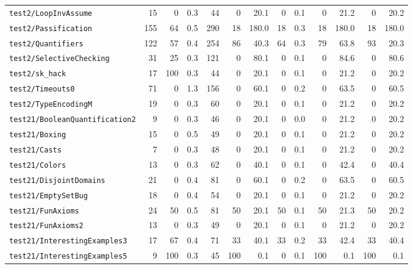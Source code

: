 \documentclass[a4paper,final]{llncs}
\begin{document}
\begin{scriptsize}
\begin{longtable}{l |r *{1}{rr} |r *{4}{rr}}
\verb|test2/LoopInvAssume|  &  15  &  0  &  0.3  &  44  &  0  &  20.1  &  0  &  0.1  &  0  &  21.2  &  0  &  20.2  \\
\verb|test2/Passification|  &  155  &  64  &  0.5  &  290  &  18  &  180.0  &  18  &  0.3  &  18  &  180.0  &  18  &  180.0  \\
\verb|test2/Quantifiers|  &  122  &  57  &  0.4  &  254  &  86  &  40.3  &  64  &  0.3  &  79  &  63.8  &  93  &  20.3  \\
\verb|test2/SelectiveChecking|  &  31  &  25  &  0.3  &  121  &  0  &  80.1  &  0  &  0.1  &  0  &  84.6  &  0  &  80.6  \\
\verb|test2/sk_hack|  &  17  &  100  &  0.3  &  44  &  0  &  20.1  &  0  &  0.1  &  0  &  21.2  &  0  &  20.2  \\
\verb|test2/Timeouts0|  &  71  &  0  &  1.3  &  156  &  0  &  60.1  &  0  &  0.2  &  0  &  63.5  &  0  &  60.5  \\
\verb|test2/TypeEncodingM|  &  19  &  0  &  0.3  &  60  &  0  &  20.1  &  0  &  0.1  &  0  &  21.2  &  0  &  20.2  \\
\verb|test21/BooleanQuantification2|  &  9  &  0  &  0.3  &  46  &  0  &  20.1  &  0  &  0.0  &  0  &  21.2  &  0  &  20.2  \\
\verb|test21/Boxing|  &  15  &  0  &  0.5  &  49  &  0  &  20.1  &  0  &  0.1  &  0  &  21.2  &  0  &  20.2  \\
\verb|test21/Casts|  &  7  &  0  &  0.3  &  48  &  0  &  20.1  &  0  &  0.1  &  0  &  21.2  &  0  &  20.2  \\
\verb|test21/Colors|  &  13  &  0  &  0.3  &  62  &  0  &  40.1  &  0  &  0.1  &  0  &  42.4  &  0  &  40.4  \\
\verb|test21/DisjointDomains|  &  21  &  0  &  0.4  &  81  &  0  &  60.1  &  0  &  0.2  &  0  &  63.5  &  0  &  60.5  \\
\verb|test21/EmptySetBug|  &  18  &  0  &  0.4  &  54  &  0  &  20.1  &  0  &  0.1  &  0  &  21.2  &  0  &  20.2  \\
\verb|test21/FunAxioms|  &  24  &  50  &  0.5  &  81  &  50  &  20.1  &  50  &  0.1  &  50  &  21.3  &  50  &  20.2  \\
\verb|test21/FunAxioms2|  &  13  &  0  &  0.3  &  49  &  0  &  20.1  &  0  &  0.1  &  0  &  21.2  &  0  &  20.2  \\
\verb|test21/InterestingExamples3|  &  17  &  67  &  0.4  &  71  &  33  &  40.1  &  33  &  0.2  &  33  &  42.4  &  33  &  40.4  \\
\verb|test21/InterestingExamples5|  &  9  &  100  &  0.3  &  45  &  100  &  0.1  &  0  &  0.1  &  100  &  0.1  &  100  &  0.1  \\

\end{longtable}
\end{scriptsize}
\end{document}
